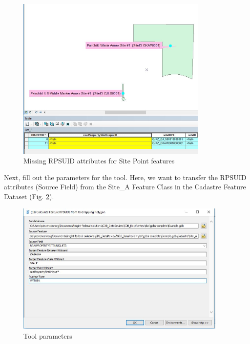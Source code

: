 \documentclass[openany]{book}
\theoremstyle{definition}
\theoremstyle{definition}
\theoremstyle{definition}
\theoremstyle{remark}
\begin{document}
\begin{figure}[H]

{\centering \includegraphics[width=3.72in,]{figures/spatjoinCalc-before} 

}

\caption{Missing RPSUID attributes for Site Point features}\label{fig:sjcbefore}
\end{figure}

Next, fill out the parameters for the tool. Here, we want to transfer
the RPSUID attributes (Source Field) from the Site\_A Feature Class in
the Cadastre Feature Dataset (Fig. \ref{fig:sjcparams}).

\begin{figure}[H]

{\centering \includegraphics[width=4.09in,]{figures/spatjoinCalc-toolparams} 

}

\caption{Tool parameters}\label{fig:sjcparams}
\end{figure}
\end{document}
